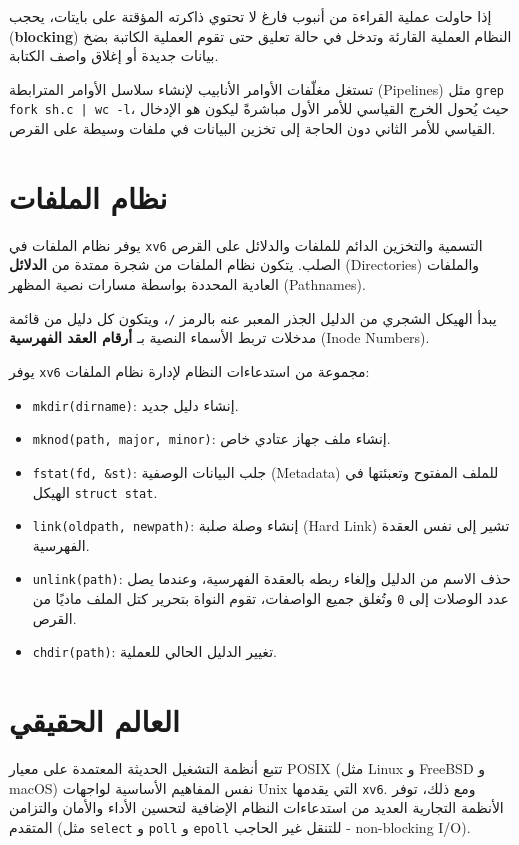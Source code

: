إذا حاولت عملية القراءة من أنبوب فارغ لا تحتوي ذاكرته المؤقتة على بايتات، يحجب (\textbf{blocking}) النظام العملية القارئة وتدخل في حالة تعليق حتى تقوم العملية الكاتبة بضخ بيانات جديدة أو إغلاق واصف الكتابة.

تستغل مغلّفات الأوامر الأنابيب لإنشاء سلاسل الأوامر المترابطة (Pipelines) مثل \texttt{grep fork sh.c | wc -l}، حيث يُحول الخرج القياسي للأمر الأول مباشرةً ليكون هو الإدخال القياسي للأمر الثاني دون الحاجة إلى تخزين البيانات في ملفات وسيطة على القرص.

\section{نظام الملفات}
\label{sec:filesystem}

يوفر نظام الملفات في \texttt{xv6} التسمية والتخزين الدائم للملفات والدلائل على القرص الصلب. يتكون نظام الملفات من شجرة ممتدة من \textbf{الدلائل} (Directories) والملفات العادية المحددة بواسطة مسارات نصية المظهر (Pathnames).

يبدأ الهيكل الشجري من الدليل الجذر المعبر عنه بالرمز \texttt{/}، ويتكون كل دليل من قائمة مدخلات تربط الأسماء النصية بـ \textbf{أرقام العقد الفهرسية} (Inode Numbers).

يوفر \texttt{xv6} مجموعة من استدعاءات النظام لإدارة نظام الملفات:
\begin{itemize}
  \item \texttt{mkdir(dirname)}: إنشاء دليل جديد.
  \item \texttt{mknod(path, major, minor)}: إنشاء ملف جهاز عتادي خاص.
  \item \texttt{fstat(fd, \&st)}: جلب البيانات الوصفية (Metadata) للملف المفتوح وتعبئتها في الهيكل \texttt{struct stat}.
  \item \texttt{link(oldpath, newpath)}: إنشاء وصلة صلبة (Hard Link) تشير إلى نفس العقدة الفهرسية.
  \item \texttt{unlink(path)}: حذف الاسم من الدليل وإلغاء ربطه بالعقدة الفهرسية، وعندما يصل عدد الوصلات إلى \texttt{0} وتُغلق جميع الواصفات، تقوم النواة بتحرير كتل الملف ماديًا من القرص.
  \item \texttt{chdir(path)}: تغيير الدليل الحالي للعملية.
\end{itemize}

\section{العالم الحقيقي}
\label{sec:real_world}

تتبع أنظمة التشغيل الحديثة المعتمدة على معيار POSIX (مثل Linux و FreeBSD و macOS) نفس المفاهيم الأساسية لواجهات Unix التي يقدمها \texttt{xv6}. ومع ذلك، توفر الأنظمة التجارية العديد من استدعاءات النظام الإضافية لتحسين الأداء والأمان والتزامن المتقدم (مثل \texttt{select} و \texttt{poll} و \texttt{epoll} للتنقل غير الحاجب - non-blocking I/O).

